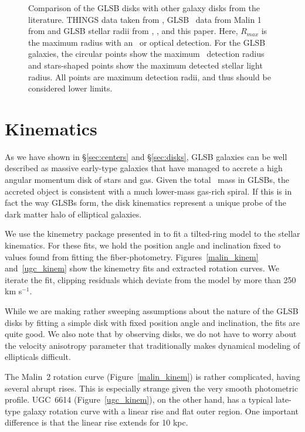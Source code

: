\documentclass[12pt,preprint]{aastex}
\newcommand\kms{km s$^{-1}$}
\newcommand\HI{\ion{H}{1}}
\begin{document}
\begin{figure*}
\caption{ Comparison of the GLSB disks with other galaxy disks from the literature.
THINGS data taken from \citet{DeBlok2008}, GLSB \HI\ data from Malin 1 from \citet{Pickering97} and GLSB stellar radii from \citet{Galaz15}, \citet{Kasparova14}, and this paper.
Here, $R_{max}$ is the maximum radius with an \HI\ or optical detection.
For the GLSB galaxies, the circular points show the maximum \HI\ detection radius and stars-shaped points show the maximum detected stellar light radius.
All points are maximum detection radii, and thus should be considered lower limits.
 \label{disk_comp}}
\end{figure*}


\section{Kinematics}\label{sec:kinematics}

As we have shown in \S\ref{sec:centers} and \S\ref{sec:disks}, GLSB galaxies can be well described as massive early-type galaxies that have managed to accrete a high angular momentum disk of stars and gas.
Given the total \HI\ mass in GLSBs, the accreted object is consistent with a much lower-mass gas-rich spiral.
If this is in fact the way GLSBs form, the disk kinematics represent a unique probe of the dark matter halo of elliptical galaxies.

We use the kinemetry package presented in \citet{Krajn06} to fit a tilted-ring model to the stellar kinematics.
For these fits, we hold the position angle and inclination fixed to values found from fitting the fiber-photometry.
Figures~\ref{malin_kinem} and~\ref{ugc_kinem} show the kinemetry fits and extracted rotation curves.
We iterate the fit, clipping residuals which deviate from the model by more than 250 \kms.


While we are making rather sweeping assumptions about the nature of the GLSB disks by fitting a simple disk with fixed position angle and inclination, the fits are quite good.
We also note that by observing disks, we do not have to worry about the velocity anisotropy parameter that traditionally makes dynamical modeling of ellipticals difficult.

The Malin~2 rotation curve (Figure~\ref{malin_kinem}) is rather complicated, having several abrupt rises.
This is especially strange given the very smooth photometric profile.
UGC~6614 (Figure~\ref{ugc_kinem}), on the other hand, has a typical late-type galaxy rotation curve with a linear rise and flat outer region.
One important difference is that the linear rise extends for 10 kpc.
\end{document}

